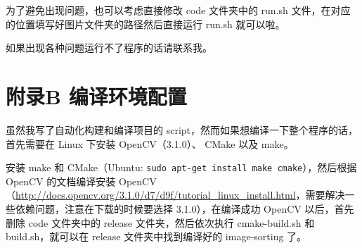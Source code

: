 \documentclass[a4paper, fontset=none]{article}
\begin{document}
为了避免出现问题，也可以考虑直接修改 code 文件夹中的 run.sh 文件，在对应的位置填写好图片文件夹的路径然后直接运行 run.sh 就可以啦。

如果出现各种问题运行不了程序的话请联系我。

\section*{附录B 编译环境配置}
\label{sec:编译环境配置}

虽然我写了自动化构建和编译项目的 script，然而如果想编译一下整个程序的话，首先需要在 Linux 下安装 OpenCV（3.1.0）、 CMake 以及 make。

安装 make 和 CMake（Ubuntu: \texttt{sudo apt-get install make cmake}），然后根据 OpenCV 的文档编译安装 OpenCV （\url{http://docs.opencv.org/3.1.0/d7/d9f/tutorial_linux_install.html}，需要解决一些依赖问题，注意在下载的时候要选择 3.1.0），在编译成功 OpenCV 以后，首先删除 code 文件夹中的 release 文件夹，然后依次执行 cmake-build.sh 和 build.sh，就可以在 release 文件夹中找到编译好的 image-sorting 了。
\end{document}
